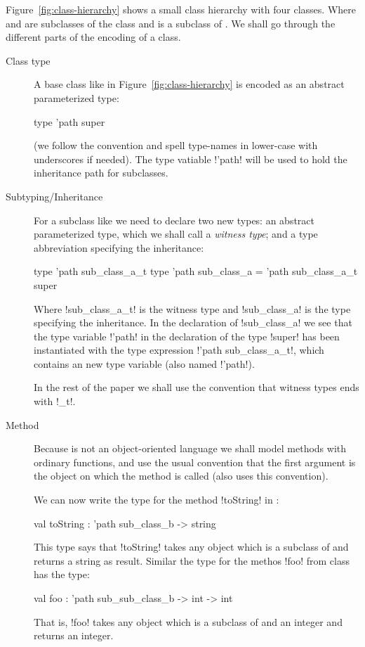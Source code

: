 \documentclass[workingdraft,endnotes]{usetex-v1}
\begin{document}
Figure~\ref{fig:class-hierarchy} shows a small class hierarchy with
four classes.  Where  and 
are subclasses of the class  and
 is a subclass of .  We
shall go through the different parts of the encoding of a class.

\begin{description}
\item[Class type] A base class like  in
  Figure~\ref{fig:class-hierarchy} is encoded as an abstract
  parameterized type:
\begin{SMLcode}
  type 'path super
\end{SMLcode}
(we follow the \sml convention and spell type-names in lower-case with
underscores if needed).  The type vatiable !'path! will be used to
hold the inheritance path for subclasses.

\item[Subtyping/Inheritance] For a subclass like 
  we need to declare two new \sml types: an abstract parameterized
  type, which we shall call a \emph{witness type}; and a type
  abbreviation specifying the inheritance:
\begin{SMLcode}
  type 'path sub_class_a_t
  type 'path sub_class_a = 
          'path sub_class_a_t super
\end{SMLcode}
Where !sub_class_a_t! is the witness type and !sub_class_a! is the
type specifying the inheritance.  In the declaration of !sub_class_a!
we see that the type variable !'path! in the declaration of the type
!super! has been instantiated with the type expression 
!'path sub_class_a_t!, which contains an new type variable (also named
!'path!).

In the rest of the paper we shall use the convention that witness
types ends with !_t!.

\item[Method] Because \sml is not an object-oriented language we shall
  model methods with ordinary functions, and use the usual convention
  that the first argument is the object on which the method is called
  (\gtk also uses this convention).
  
  We can now write the type for the method !toString! in
  :
\begin{SMLcode}
  val toString : 'path sub_class_b -> string
\end{SMLcode}
This type says that !toString! takes any object which is a subclass of
 and returns a string as result.   Similar the
type for the methos !foo! from class  has the
type:
\begin{SMLcode}
  val foo : 'path sub_sub_class_b -> int -> int
\end{SMLcode}
That is, !foo! takes any object which is a subclass of
 and an integer and returns an integer.


\end{description}
\end{document}
